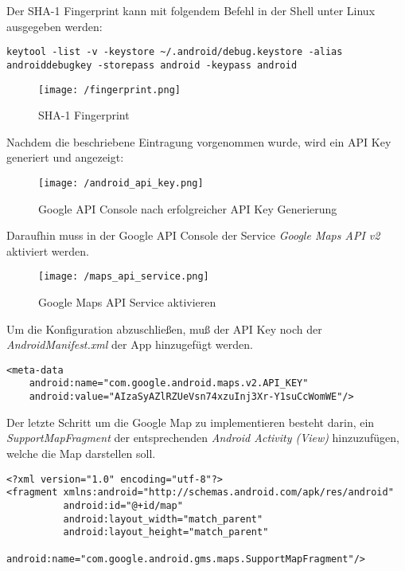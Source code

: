 Der SHA-1 Fingerprint kann mit folgendem Befehl in der Shell unter Linux ausgegeben werden: 

\begin{lstlisting}[caption={Fingerprint Ausgabe},label=lst:FingerprintOutput]
keytool -list -v -keystore ~/.android/debug.keystore -alias androiddebugkey -storepass android -keypass android
\end{lstlisting}

\begin{figure}[H]
\centering
\texttt{[image: /fingerprint.png]}
\caption[User Interface: SHA-1 Fingerprint]{SHA-1 Fingerprint}
\label{fig:fingerprint}
\end{figure}
\bigskip
Nachdem die beschriebene Eintragung vorgenommen wurde, wird ein API Key generiert und angezeigt:

\begin{figure}[H]
\centering
\texttt{[image: /android\_api\_key.png]}
\caption{Google API Console nach erfolgreicher API Key Generierung}
\label{fig:apiKeyGen}
\end{figure}
\bigskip
Daraufhin muss in der Google API Console der Service \textit{Google Maps API v2} aktiviert werden.

\begin{figure}[H]
\centering
\texttt{[image: /maps\_api\_service.png]}
\caption{Google Maps API Service aktivieren}
\label{fig:mapsApiService}
\end{figure} 
\bigskip
Um die Konfiguration abzuschließen, muß der API Key noch der \textit{AndroidManifest.xml} der App hinzugefügt werden.

\begin{lstlisting}[caption={Google Map API Key hinzufügen},label=lst:MapApiKeyInsert]
<meta-data
    android:name="com.google.android.maps.v2.API_KEY"
    android:value="AIzaSyAZlRZUeVsn74xzuInj3Xr-Y1suCcWomWE"/>
\end{lstlisting}
\bigskip
Der letzte Schritt um die Google Map zu implementieren besteht darin, ein \textit{SupportMapFragment} der entsprechenden \textit{Android Activity (View)} hinzuzufügen, welche die Map darstellen soll.

\begin{lstlisting}[caption={SupportMapFragment hinzufügen},label=lst:SupportMapFragmentInsert]
<?xml version="1.0" encoding="utf-8"?>
<fragment xmlns:android="http://schemas.android.com/apk/res/android"
          android:id="@+id/map"
          android:layout_width="match_parent"
          android:layout_height="match_parent"
          android:name="com.google.android.gms.maps.SupportMapFragment"/>
\end{lstlisting}

